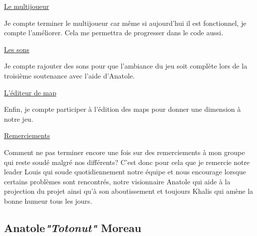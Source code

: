 \documentclass{article}
\begin{document}
\par
\underline{Le multijoueur}
\newline
\par
Je compte terminer le multijoueur car même si aujourd'hui il est fonctionnel, je compte l'améliorer. Cela me permettra de progresser dans le code aussi.
\newline

\par
\underline{Les sons}
\newline
\par
Je compte rajouter des sons pour que l'ambiance du jeu soit complète lors de la troisième soutenance avec l’aide d’Anatole.
\newline

\par
\underline{L'éditeur de map}
\newline
\par
Enfin, je compte participer à l'édition des maps pour donner une dimension à notre jeu.
\newline

\par
\underline{Remerciements}
\newline
\par
Comment ne pas terminer encore une fois sur des remerciements à mon groupe qui reste soudé malgré nos différents? C'est donc pour cela que je remercie notre leader Louis qui soude quotidiennement notre équipe et nous encourage lorsque certains problèmes sont rencontrés, notre visionnaire Anatole qui aide à la projection du projet ainsi qu'à son aboutissement et toujours Khalis qui amène la bonne humeur tous les jours.

\newpage

\subsection {Anatole\textcolor {pseudoblue} {\textit {"Totonut"}} Moreau}
\end{document}
